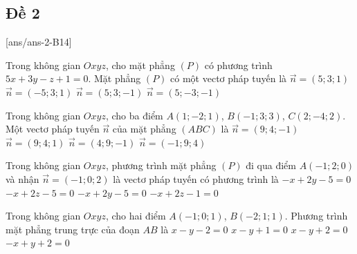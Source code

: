 \subsection{Đề 2}
[ans/ans-2-B14]
\caulc
\begin{ex}%
Trong không gian $Oxyz$, cho mặt phẳng $(P)$ có phương trình $5x+3y-z+1=0$. Mặt phẳng $(P)$ có một vectơ pháp tuyến là
\choice
{$\vec{n}=(5 ; 3 ; 1)$}
{$\vec{n}=(-5 ; 3 ; 1)$}
{\True $\vec{n}=(5 ; 3 ;-1)$}
{$\vec{n}=(5 ;-3 ;-1)$}
\end{ex}

\begin{ex}%
Trong không gian $Oxyz$, cho ba điểm $A(1 ;-2 ; 1)$, $B(-1 ; 3 ; 3)$, $C(2 ;-4 ; 2)$. Một vectơ pháp tuyến $\vec{n}$ của mặt phẳng $(A B C)$ là
\choice
{\True $\vec{n}=(9 ; 4 ;-1)$}
{$\vec{n}=(9 ; 4 ; 1)$}
{$\vec{n}=(4 ; 9 ;-1)$}
{$\vec{n}=(-1 ; 9 ; 4)$}
\end{ex}

\begin{ex}%
Trong không gian $Oxyz$, phương trình mặt phẳng $(P)$ đi qua điểm $A(-1 ; 2 ; 0)$ và nhận $\vec{n}=(-1 ; 0 ; 2)$ là vectơ pháp tuyến có phương trình là
\choice
{$-x+2 y-5=0$}
{$-x+2 z-5=0$}
{$-x+2 y-5=0$}
{\True $-x+2 z-1=0$}
\end{ex}

\begin{ex}%
Trong không gian $Oxyz$, cho hai điểm $A(-1 ; 0 ; 1)$, $B(-2 ; 1 ; 1)$. Phương trình mặt phẳng trung trực của đoạn $A B$ là
\choice
{$x-y-2=0$}
{$x-y+1=0$}
{\True $x-y+2=0$}
{$-x+y+2=0$}
\end{ex}

